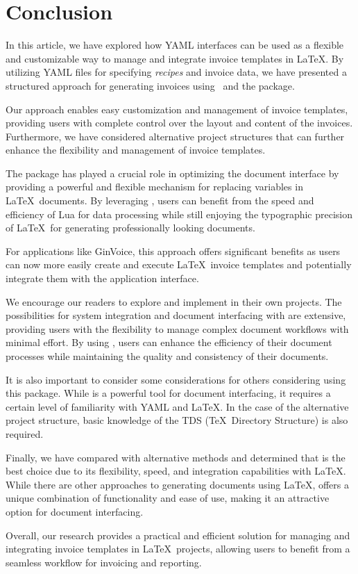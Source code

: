 \section{Conclusion}\label{sec:conclusion}

In this article, we have explored how YAML interfaces can be used as a flexible and customizable way to manage and integrate invoice templates in \LaTeX.
By utilizing YAML files for specifying \textit{recipes} and invoice data, we have presented a structured approach for generating invoices using \LuaLaTeX\ and the  package.

Our approach enables easy customization and management of invoice templates, providing users with complete control over the layout and content of the invoices.
Furthermore, we have considered alternative project structures that can further enhance the flexibility and management of invoice templates.

The  package has played a crucial role in optimizing the document interface by providing a powerful and flexible mechanism for replacing variables in \LaTeX\ documents.
By leveraging \LuaLaTeX, users can benefit from the speed and efficiency of Lua for data processing while still enjoying the typographic precision of \LaTeX\ for generating professionally looking documents.

For applications like GinVoice, this approach offers significant benefits as users can now more easily create and execute \LaTeX\ invoice templates and potentially integrate them with the application interface.

We encourage our readers to explore and implement  in their own projects.
The possibilities for system integration and document interfacing with  are extensive, providing users with the flexibility to manage complex document workflows with minimal effort.
By using , users can enhance the efficiency of their document processes while maintaining the quality and consistency of their documents.

It is also important to consider some considerations for others considering using this package.
While  is a powerful tool for document interfacing, it requires a certain level of familiarity with YAML and \LaTeX.
In the case of the alternative project structure, basic knowledge of the TDS (\TeX\ Directory Structure) is also required.

Finally, we have compared with alternative methods and determined that  is the best choice due to its flexibility, speed, and integration capabilities with \LaTeX.
While there are other approaches to generating documents using \LaTeX,  offers a unique combination of functionality and ease of use, making it an attractive option for document interfacing.

Overall, our research provides a practical and efficient solution for managing and integrating invoice templates in \LaTeX\ projects, allowing users to benefit from a seamless workflow for invoicing and reporting.
